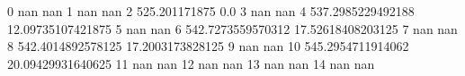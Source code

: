 0 nan nan
1 nan nan
2 525.201171875 0.0
3 nan nan
4 537.2985229492188 12.09735107421875
5 nan nan
6 542.7273559570312 17.52618408203125
7 nan nan
8 542.4014892578125 17.2003173828125
9 nan nan
10 545.2954711914062 20.09429931640625
11 nan nan
12 nan nan
13 nan nan
14 nan nan

